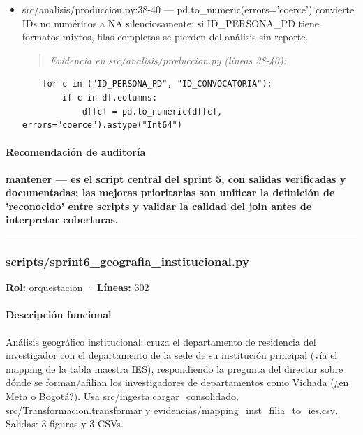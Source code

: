 \begin{tcolorbox}[riesgo]
\begin{itemize}
  \item src/analisis/produccion.py:38-40 --- pd.to\_numeric(errors='coerce') convierte IDs no numéricos a NA silenciosamente; si ID\_PERSONA\_PD tiene formatos mixtos, filas completas se pierden del análisis sin reporte.
\begin{quote}\footnotesize\ttfamily
\noindent\emph{Evidencia en src/analisis/produccion.py (líneas 38-40):}
\end{quote}
\begin{lstlisting}
    for c in ("ID_PERSONA_PD", "ID_CONVOCATORIA"):
        if c in df.columns:
            df[c] = pd.to_numeric(df[c], errors="coerce").astype("Int64")
\end{lstlisting}

\end{itemize}
\end{tcolorbox}

\paragraph{Recomendación de auditoría}
\textbf{mantener --- es el script central del sprint 5, con salidas verificadas y documentadas; las mejoras prioritarias son unificar la definición de 'reconocido' entre scripts y validar la calidad del join antes de interpretar coberturas.}

\medskip
\hrule

\subsubsection{scripts/sprint6\_geografia\_institucional.py}
\textbf{Rol:} orquestacion · \textbf{Líneas:} 302

\paragraph{Descripción funcional}
Análisis geográfico institucional: cruza el departamento de residencia del investigador con el departamento de la sede de su institución principal (vía el mapping de la tabla maestra IES), respondiendo la pregunta del director sobre dónde se forman/afilian los investigadores de departamentos como Vichada (¿en Meta o Bogotá?). Usa src/ingesta.cargar\_consolidado, src/Transformacion.transformar y evidencias/mapping\_inst\_filia\_to\_ies.csv. Salidas: 3 figuras y 3 CSVs.

